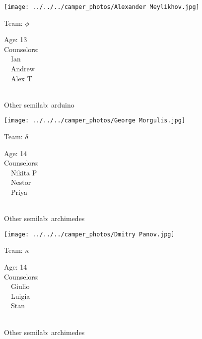 \documentclass[10pt,letterpaper, landscape]{article}
\begin{document}
\horizontalshiftfornextsticker
\renewcommand{\baselinestretch}{1} \begin{sticker}
\noindent\begin{minipage}{0.5\textwidth}\texttt{[image: ../../../camper\_photos/Alexander Meylikhov.jpg]}\end{minipage}\begin{minipage}{0.45\textwidth}
Team: {\Large $\phi$}

Age:        13\\
Counselors: \\\ \ Ian\\\ \ Andrew\\\ \ Alex T\\
\end{minipage} \\ \vspace{0.07in}
Other semilab: arduino
\end{sticker}
\verticalshiftfornextsticker
\renewcommand{\baselinestretch}{1} \begin{sticker}
\noindent\begin{minipage}{0.5\textwidth}\texttt{[image: ../../../camper\_photos/George Morgulis.jpg]}\end{minipage}\begin{minipage}{0.45\textwidth}
Team: {\Large $\delta$}

Age:        14\\
Counselors: \\\ \ Nikita P\\\ \ Nestor\\\ \ Priya\\
\end{minipage} \\ \vspace{0.07in}
Other semilab: archimedes
\end{sticker}
\horizontalshiftfornextsticker
\renewcommand{\baselinestretch}{1} \begin{sticker}
\noindent\begin{minipage}{0.5\textwidth}\texttt{[image: ../../../camper\_photos/Dmitry Panov.jpg]}\end{minipage}\begin{minipage}{0.45\textwidth}
Team: {\Large $\kappa$}

Age:        14\\
Counselors: \\\ \ Giulio\\\ \ Luigia\\\ \ Stan\\
\end{minipage} \\ \vspace{0.07in}
Other semilab: archimedes
\end{sticker}
\end{document}
